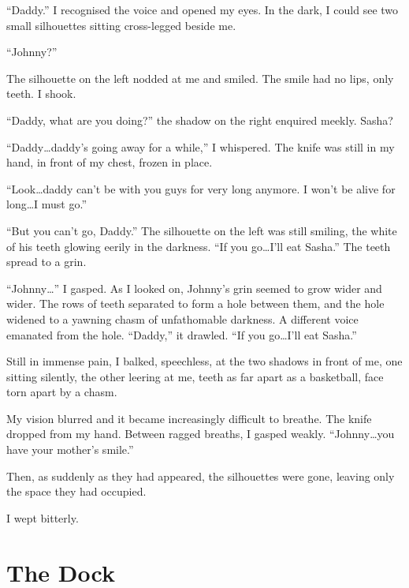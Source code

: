 ``Daddy.'' I recognised the voice and opened my eyes. In the dark, I
could see two small silhouettes sitting cross-legged beside
me.

``Johnny?''

The silhouette on the left nodded at me and smiled. The smile had
no lips, only teeth. I shook.

``Daddy, what are you doing?'' the shadow on the right enquired
meekly. Sasha?

``Daddy{\ldots}daddy's going away for a while,'' I whispered. The knife
was still in my hand, in front of my chest, frozen in place.

``Look{\ldots}daddy can't be with you guys for very long anymore. I won't
be alive for long{\ldots}I must go.''

``But you can't go, Daddy.'' The silhouette on the left was still
smiling, the white of his teeth glowing eerily in the darkness. ``If
you go{\ldots}I'll eat Sasha.'' The teeth spread to a grin.



``Johnny{\ldots}'' I gasped. As I looked on, Johnny's grin seemed to grow
wider and wider. The rows of teeth separated to form a hole between
them, and the hole widened to a yawning chasm of unfathomable
darkness. A different voice emanated from the hole. ``Daddy,'' it
drawled. ``If you go{\ldots}I'll eat Sasha.''



Still in immense pain, I balked, speechless, at the two shadows in
front of me, one sitting silently, the other leering at me, teeth
as far apart as a basketball, face torn apart by a chasm.

My vision blurred and it became increasingly difficult to breathe.
The knife dropped from my hand. Between ragged breaths, I gasped
weakly. ``Johnny{\ldots}you have your mother's smile.''



Then, as suddenly as they had appeared, the silhouettes were gone,
leaving only the space they had occupied.



I wept bitterly. 
 



\chapter{The Dock}



